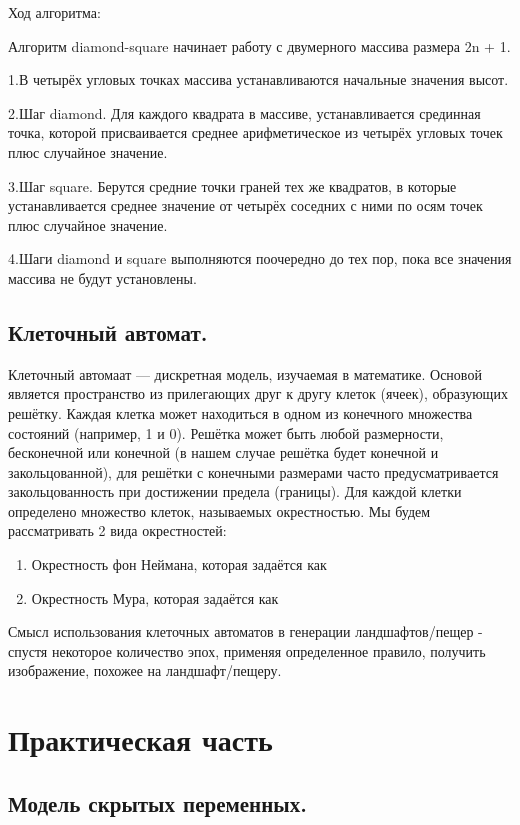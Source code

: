 Ход алгоритма:

Алгоритм diamond-square начинает работу с двумерного массива размера 2n + 1. 

1.В четырёх угловых точках массива устанавливаются начальные значения высот. 

2.Шаг diamond. Для каждого квадрата в массиве, устанавливается срединная точка, которой присваивается среднее арифметическое из четырёх угловых точек плюс случайное значение.

3.Шаг square. Берутся средние точки граней тех же квадратов, в которые устанавливается среднее значение от четырёх соседних с ними по осям точек плюс случайное значение.

4.Шаги diamond и square выполняются поочередно до тех пор, пока все значения массива не будут установлены.

\section{Клеточный автомат.}

Клеточный автомаат — дискретная модель, изучаемая в математике. Основой является пространство из прилегающих друг к другу клеток (ячеек), образующих решётку. Каждая клетка может находиться в одном из конечного множества состояний (например, 1 и 0). Решётка может быть любой размерности, бесконечной или конечной (в нашем случае решётка будет конечной и закольцованной), для решётки с конечными размерами часто предусматривается закольцованность при достижении предела (границы). Для каждой клетки определено множество клеток, называемых окрестностью. Мы будем рассматривать 2 вида окрестностей:
\begin{enumerate}
    \item Окрестность фон Неймана, которая задаётся как
    \item Окрестность Мура, которая задаётся как
\end{enumerate}

Смысл использования клеточных автоматов в генерации ландшафтов/пещер - спустя некоторое количество  эпох, применяя определенное правило, получить изображение, похожее на ландшафт/пещеру.

\chapter{Практическая часть}
\section{Модель скрытых переменных.}



